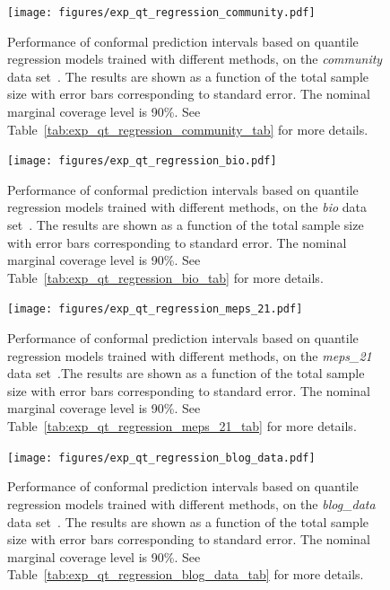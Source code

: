 \begin{figure}[!htb]
    \centering
    \texttt{[image: figures/exp\_qt\_regression\_community.pdf]}
    \caption{\color{blue} Performance of conformal prediction intervals based on quantile regression models trained with different methods, on the {\em community} data set~\cite{community}. The results are shown as a function of the total sample size with error bars corresponding to standard error. The nominal marginal coverage level is 90\%. See Table~\ref{tab:exp_qt_regression_community_tab} for more details.}
    \label{fig:exp_qt_regression_community}
\end{figure}

\begin{figure}[!htb]
    \centering
    \texttt{[image: figures/exp\_qt\_regression\_bio.pdf]}
    \caption{\color{blue} Performance of conformal prediction intervals based on quantile regression models trained with different methods, on the {\em bio} data set~\cite{data-bio}. The results are shown as a function of the total sample size with error bars corresponding to standard error. The nominal marginal coverage level is 90\%. See Table~\ref{tab:exp_qt_regression_bio_tab} for more details.}
    \label{fig:exp_qt_regression_bio}
\end{figure}

\begin{figure}[!htb]
    \centering
    \texttt{[image: figures/exp\_qt\_regression\_meps\_21.pdf]}
    \caption{\color{blue} Performance of conformal prediction intervals based on quantile regression models trained with different methods, on the {\em meps\_21} data set~\cite{meps_21}.The results are shown as a function of the total sample size with error bars corresponding to standard error. The nominal marginal coverage level is 90\%. See Table~\ref{tab:exp_qt_regression_meps_21_tab} for more details.}
    \label{fig:exp_qt_regression_meps_21}
\end{figure}

\begin{figure}[!htb]
    \centering
    \texttt{[image: figures/exp\_qt\_regression\_blog\_data.pdf]}
    \caption{\color{blue} Performance of conformal prediction intervals based on quantile regression models trained with different methods, on the {\em blog\_data} data set~\cite{blog_data}. The results are shown as a function of the total sample size with error bars corresponding to standard error. The nominal marginal coverage level is 90\%. See Table~\ref{tab:exp_qt_regression_blog_data_tab} for more details.}
    \label{fig:exp_qt_regression_blog_data}
\end{figure}

